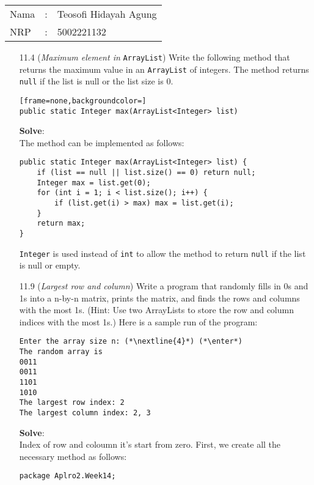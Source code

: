\documentclass{article}
\newcommand{\enter}{\raisebox{-1.8pt}{\begin{tikzpicture}[scale=0.3]
    \draw[thin,fill=lightgray] (0,0) rectangle (2,1);
    \draw (0.3,0.3) -- (0.7,0.3)--(0.7,0.6);     
\end{tikzpicture}}}
\newcommand{\nextline}[1]{\raisebox{0pt}[1pt]{\colorbox{input}{#1}}}
\newcommand{\jawab}{\textbf{Solve}:}
\begin{document}
    \setcounter{section}{3}
    \setcounter{subsection}{1}
    \begin{tabular}{|lcl|}
     \hline
     Nama&:&Teosofi Hidayah Agung\\
     NRP&:&5002221132\\
     \hline
    \end{tabular}

    \begin{enumerate}
        \item[\color{lblue}11.4] (\textit{Maximum element in} \texttt{\color{lblue}ArrayList}) Write the following method that returns the maximum value in an \texttt{\color{lblue}ArrayList} of integers. The method returns \texttt{\color{lblue}null} if the list is null or the list size is {\color{lblue}0}.
        \begin{lstlisting}[frame=none,backgroundcolor=]
public static Integer max(ArrayList<Integer> list)
        \end{lstlisting}
        \jawab\\
        The method can be implemented as follows:
        \begin{lstlisting}[backgroundcolor=\color{bg}]
public static Integer max(ArrayList<Integer> list) {
    if (list == null || list.size() == 0) return null;
    Integer max = list.get(0);
    for (int i = 1; i < list.size(); i++) {
        if (list.get(i) > max) max = list.get(i);
    }
    return max;
}
        \end{lstlisting}
        \texttt{Integer} is used instead of \texttt{int} to allow the method to return \texttt{null} if the list is null or empty.

        \item[\color{lblue}11.9] (\textit{Largest row and column}) Write a program that randomly fills in {\color{lblue}0}s and {\color{lblue}1}s into a n-by-n matrix, prints the matrix, and finds the rows and columns with the most {\color{lblue}1}s. (Hint: Use two {\color{lblue} ArrayLists} to store the row and column indices with the most {\color{lblue}1}s.) Here is a sample run of the program:
        \begin{lstlisting}
Enter the array size n: (*\nextline{4}*) (*\enter*)
The random array is
0011
0011
1101
1010
The largest row index: 2
The largest column index: 2, 3
        \end{lstlisting}
        \jawab\\
        Index of row and coloumn it's start from zero. First, we create all the necessary method as follows:
        \begin{lstlisting}[backgroundcolor=\color{bg}]
package Aplro2.Week14;


\end{lstlisting}
\end{enumerate}
\end{document}
